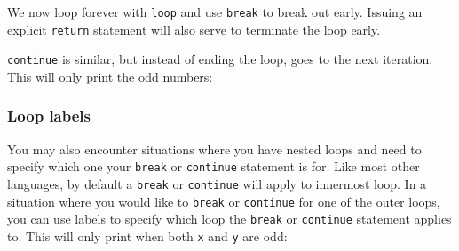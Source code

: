 \documentclass[a4paper,]{book}
\newenvironment{Shaded}{\begin{snugshade}}{\end{snugshade}}
\newcommand{\KeywordTok}[1]{\textcolor[rgb]{0.13,0.29,0.53}{\textbf{{#1}}}}
\newcommand{\DecValTok}[1]{\textcolor[rgb]{0.00,0.00,0.81}{{#1}}}
\newcommand{\StringTok}[1]{\textcolor[rgb]{0.31,0.60,0.02}{{#1}}}
\newcommand{\CommentTok}[1]{\textcolor[rgb]{0.56,0.35,0.01}{\textit{{#1}}}}
\newcommand{\OtherTok}[1]{\textcolor[rgb]{0.56,0.35,0.01}{{#1}}}
\newcommand{\NormalTok}[1]{{#1}}
\begin{document}
We now loop forever with \texttt{loop} and use \texttt{break} to break
out early. Issuing an explicit \texttt{return} statement will also serve
to terminate the loop early.

\texttt{continue} is similar, but instead of ending the loop, goes to
the next iteration. This will only print the odd numbers:

\begin{Shaded}
\end{Shaded}

\subsubsection{Loop labels}\label{loop-labels}

You may also encounter situations where you have nested loops and need
to specify which one your \texttt{break} or \texttt{continue} statement
is for. Like most other languages, by default a \texttt{break} or
\texttt{continue} will apply to innermost loop. In a situation where you
would like to \texttt{break} or \texttt{continue} for one of the outer
loops, you can use labels to specify which loop the \texttt{break} or
\texttt{continue} statement applies to. This will only print when both
\texttt{x} and \texttt{y} are odd:

\begin{Shaded}
\end{Shaded}
\end{document}
